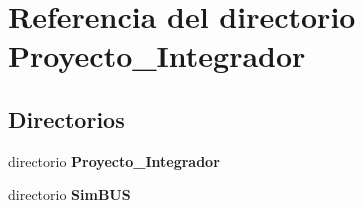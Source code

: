 \section{Referencia del directorio Proyecto\-\_\-\-Integrador}
\label{dir_3706c83a47c1c453a24d7a4f4bc34c8d}
\subsection*{Directorios}
\begin{DoxyCompactItemize}
\item 
directorio {\bf Proyecto\-\_\-\-Integrador}
\item 
directorio {\bf Sim\-B\-U\-S}
\end{DoxyCompactItemize}

